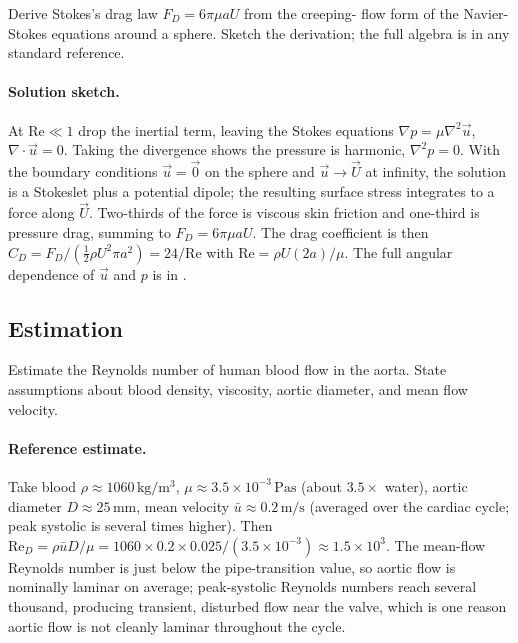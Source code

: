\begin{exercise}
Derive Stokes's drag law $F_D = 6\pi\mu a U$ from the creeping-
flow form of the Navier-Stokes equations around a sphere. Sketch
the derivation; the full algebra is in any standard reference.

\paragraph{Solution sketch.} At $\text{Re}\ll1$ drop the inertial
term, leaving the Stokes equations $\nabla p = \mu\nabla^2\vec u$,
$\nabla\cdot\vec u = 0$. Taking the divergence shows the pressure is
harmonic, $\nabla^2 p = 0$. With the boundary conditions $\vec u =
\vec 0$ on the sphere and $\vec u\to\vec U$ at infinity, the solution
is a Stokeslet plus a potential dipole; the resulting surface stress
integrates to a force along $\vec U$. Two-thirds of the force is
viscous skin friction and one-third is pressure drag, summing to
$F_D = 6\pi\mu a U$. The drag coefficient is then $C_D = F_D/(\tfrac12
\rho U^2\pi a^2) = 24/\text{Re}$ with $\text{Re} = \rho U(2a)/\mu$.
The full angular dependence of $\vec u$ and $p$ is in
\cite{paper:ch02t3b-stokes-1851}.
\end{exercise}

\subsection*{Estimation}

\begin{exercise}
Estimate the Reynolds number of human blood flow in the aorta.
State assumptions about blood density, viscosity, aortic diameter,
and mean flow velocity.

\paragraph{Reference estimate.} Take blood $\rho \approx 1060\,\si{
\kilogram\per\meter\cubed}$, $\mu \approx 3.5\times10^{-3}\,\si{
\pascal\second}$ (about $3.5\times$ water), aortic diameter $D
\approx 25\,\si{\milli\meter}$, mean velocity $\bar u\approx0.2\,\si{
\meter\per\second}$ (averaged over the cardiac cycle; peak systolic
is several times higher). Then $\text{Re}_D = \rho\bar u D/\mu =
1060\times0.2\times0.025/(3.5\times10^{-3}) \approx 1.5\times10^{3}$.
The mean-flow Reynolds number is just below the pipe-transition value,
so aortic flow is nominally laminar on average; peak-systolic
Reynolds numbers reach several thousand, producing transient,
disturbed flow near the valve, which is one reason aortic flow is
not cleanly laminar throughout the cycle.
\end{exercise}

